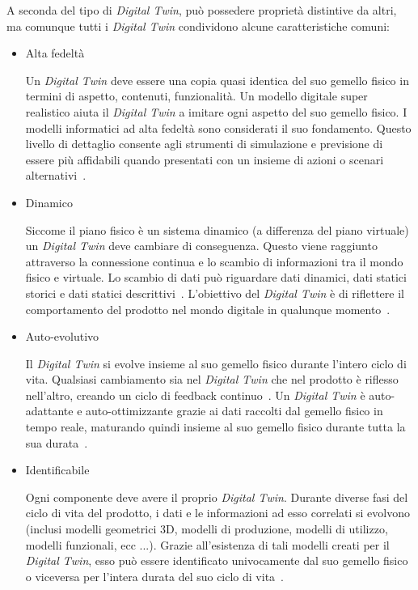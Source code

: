 A seconda del tipo di \emph{Digital Twin}, può possedere proprietà distintive da altri, ma comunque tutti i \emph{Digital Twin} condividono alcune caratteristiche comuni:
\begin{itemize}
    \item Alta fedeltà
    
    Un \emph{Digital Twin} deve essere una copia quasi identica del suo gemello fisico in termini di aspetto, contenuti, funzionalità. Un modello digitale super realistico aiuta il \emph{Digital Twin} a imitare ogni aspetto del suo gemello fisico. I modelli informatici ad alta fedeltà sono considerati il suo fondamento. Questo livello di dettaglio consente agli strumenti di simulazione e previsione di essere più affidabili quando presentati con un insieme di azioni o scenari alternativi~\cite{Fedelta}.

    \item Dinamico

    Siccome il piano fisico è un sistema dinamico (a differenza del piano virtuale)  un \emph{Digital Twin} deve cambiare di conseguenza. Questo viene raggiunto attraverso la connessione continua e lo scambio di informazioni tra il mondo fisico e virtuale. Lo scambio di dati può riguardare dati dinamici, dati statici storici e dati statici descrittivi~\cite{Evolutivo}. L'obiettivo del \emph{Digital Twin} è di riflettere il comportamento del prodotto nel mondo digitale in qualunque momento~\cite{Culla}.

    \item Auto-evolutivo

    Il \emph{Digital Twin} si evolve insieme al suo gemello fisico durante l'intero ciclo di vita. Qualsiasi cambiamento sia nel \emph{Digital Twin} che nel prodotto è riflesso nell'altro, creando un ciclo di feedback continuo~\cite{Culla}. Un \emph{Digital Twin} è auto-adattante e auto-ottimizzante grazie ai dati raccolti dal gemello fisico in tempo reale, maturando quindi insieme al suo gemello fisico durante tutta la sua durata~\cite{Evolutivo}.

    \newpage

    \item Identificabile
    
    Ogni componente deve avere il proprio \emph{Digital Twin}. Durante diverse fasi del ciclo di vita del prodotto, i dati e le informazioni ad esso correlati si evolvono (inclusi modelli geometrici 3D, modelli di produzione, modelli di utilizzo, modelli funzionali, ecc ...). Grazie all'esistenza di tali modelli creati per il \emph{Digital Twin}, esso può essere identificato univocamente dal suo gemello fisico o viceversa per l'intera durata del suo ciclo di vita~\cite{Identificabile}.
    

\end{itemize}
